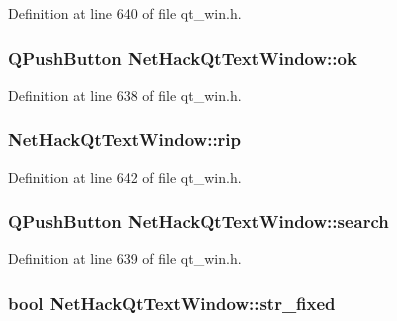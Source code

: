 Definition at line 640 of file qt\+\_\+win.\+h.

\hypertarget{classNetHackQtTextWindow_a70453eecbf97c7c2830b5086bd95ae42}{
\subsubsection[{ok}]{\setlength{\rightskip}{0pt plus 5cm}Q\+Push\+Button Net\+Hack\+Qt\+Text\+Window\+::ok\hspace{0.3cm}{\ttfamily [private]}}}\label{classNetHackQtTextWindow_a70453eecbf97c7c2830b5086bd95ae42}


Definition at line 638 of file qt\+\_\+win.\+h.

\hypertarget{classNetHackQtTextWindow_a83d61a14cdfed1f73829f2c698b69132}{
\subsubsection[{rip}]{ Net\+Hack\+Qt\+Text\+Window\+::rip\hspace{0.3cm}{\ttfamily [private]}}}\label{classNetHackQtTextWindow_a83d61a14cdfed1f73829f2c698b69132}


Definition at line 642 of file qt\+\_\+win.\+h.

\hypertarget{classNetHackQtTextWindow_a1793178ad401fa8a653543d10cf0a9ea}{
\subsubsection[{search}]{\setlength{\rightskip}{0pt plus 5cm}Q\+Push\+Button Net\+Hack\+Qt\+Text\+Window\+::search\hspace{0.3cm}{\ttfamily [private]}}}\label{classNetHackQtTextWindow_a1793178ad401fa8a653543d10cf0a9ea}


Definition at line 639 of file qt\+\_\+win.\+h.

\hypertarget{classNetHackQtTextWindow_a75af29de4f6d55d027abc4132ef5f786}{
\subsubsection[{str\+\_\+fixed}]{\setlength{\rightskip}{0pt plus 5cm}bool Net\+Hack\+Qt\+Text\+Window\+::str\+\_\+fixed\hspace{0.3cm}{\ttfamily [private]}}}\label{classNetHackQtTextWindow_a75af29de4f6d55d027abc4132ef5f786}


